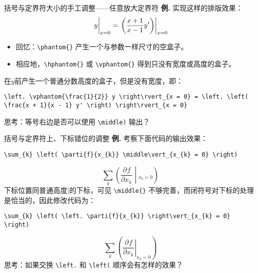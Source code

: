 \documentclass[mathserif]{beamer}
\newcommand{\codegreen}[1]{\textcolor{codegreen}{#1}}
\newcommand{\parti}[3][]{\frac{\partial^{#1} #2}{\partial {#3}^{#1}}}
\newenvironment{instance}{\zihao{-5}\textbf{\songti \codegreen{例.}}}{\hfill\par}
\begin{document}
\begin{frame}[fragile]{括号与定界符}{大小的手工调整——任意放大定界符}
\begin{instance}
	实现这样的排版效果：
\begin{equation*}
	\left. \vphantom{\frac{1}{2}} y \right\rvert_{x = 0} = \left. \left( \frac{x + 1}{x - 1} y' \right) \right\rvert_{x = 0}
\end{equation*}
\begin{itemize}

\item 回忆：\lstinline'\phantom{}' 产生一个与参数一样尺寸的空盒子。

\item 相应地，\lstinline'\hphantom{}' 或 \lstinline'\vphantom{}' 得到只没有宽度或高度的盒子。

\end{itemize}
在$y$前产生一个普通分数高度的盒子，但是没有宽度，即：
\begin{lstlisting}[numbers=none]
\left. \vphantom{\frac{1}{2}} y \right\rvert_{x = 0} = \left. \left( \frac{x + 1}{x - 1} y' \right) \right\rvert_{x = 0}
\end{lstlisting}
思考：等号右边是否可以使用 \lstinline'\middle)' 输出？
\end{instance}
\end{frame}

\begin{frame}[fragile]{括号与定界符}{上、下标错位的调整}
\begin{instance}
	考察下面代码的输出效果：
\begin{lstlisting}[numbers=none]
\sum_{k} \left( \parti{f}{x_{k}} \middle\vert_{x_{k} = 0} \right)
\end{lstlisting}
\begin{equation*}
	\sum_{k} \left( \parti{f}{x_{k}} \middle\vert_{x_{k} = 0} \right)
\end{equation*}
下标位置同普通高度$\vert$的下标，可见 \lstinline'\middle{}' 不够完善，而闭符号对下标的处理是恰当的，因此修改代码为：
\begin{lstlisting}[numbers=none]
\sum_{k} \left( \left. \parti{f}{x_{k}} \right\vert_{x_{k} = 0} \right)
\end{lstlisting}
\begin{equation*}
	\sum_{k} \left( \left. \parti{f}{x_{k}} \right\vert_{x_{k} = 0} \right)
\end{equation*}
思考：如果交换 \lstinline'\left.' 和 \lstinline'\left(' 顺序会有怎样的效果？
\end{instance}
\end{frame}
\end{document}
